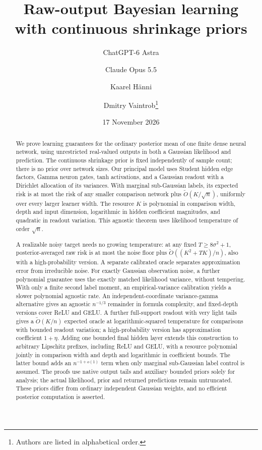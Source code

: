 \documentclass[11pt]{article}
\title{Raw-output Bayesian learning\\with continuous shrinkage priors}
\author{ChatGPT-6 Astra \and Claude Opus 5.5 \and Kaarel H\"anni \and
Dmitry Vaintrob\thanks{Authors are listed in alphabetical order.}}
\date{17 November 2026}
\theoremstyle{remark}\newtheorem{remark}[theorem]{Remark}
\begin{document}
\maketitle
\begin{abstract}
We prove learning guarantees for the ordinary posterior mean of one
finite dense neural network, using unrestricted real-valued outputs in
both a Gaussian likelihood and prediction. The continuous shrinkage
prior is fixed independently of sample count; there is no prior over
network sizes. Our principal model uses Student hidden edge factors,
Gamma neuron gates, tanh activations, and a Gaussian readout with a
Dirichlet allocation of its variances. With marginal sub-Gaussian labels,
its expected risk is at most the risk of any smaller comparison network
plus $\widetilde O(K/\sqrt n)$, uniformly over every larger learner width.
The resource $K$ is polynomial in comparison width, depth and input
dimension, logarithmic in hidden coefficient magnitudes, and quadratic
in readout variation. This agnostic theorem uses likelihood temperature
of order $\sqrt n$.

A realizable noisy target needs no growing temperature: at any fixed
$T\ge8\sigma^2+1$, posterior-averaged raw risk is at most the noise floor
plus $\widetilde O((K^2+TK)/n)$, also with a high-probability version.
A separate calibrated oracle separates approximation error from irreducible
noise. For exactly Gaussian observation noise, a further polynomial
guarantee uses the exactly matched likelihood variance, without tempering. With only a finite second label moment, an empirical-variance
calibration yields a slower polynomial agnostic rate. An independent-coordinate
variance-gamma alternative gives an agnostic $n^{-1/3}$ remainder in
formula complexity, and fixed-depth versions cover ReLU and GELU.
A further full-support readout with very light tails gives a
$\widetilde O(K/n)$ expected oracle at logarithmic-squared temperature
for comparisons with bounded readout variation; a high-probability
version has approximation coefficient $1+\eta$. Adding one bounded
final hidden layer extends this construction to arbitrary Lipschitz
prefixes, including ReLU and GELU, with a resource polynomial jointly
in comparison width and depth and logarithmic in coefficient bounds.
The latter bound adds an $n^{-1+o(1)}$ term when only marginal
sub-Gaussian label control is assumed.
The proofs use native output tails and auxiliary bounded priors solely
for analysis; the actual likelihood, prior and returned predictions
remain untruncated. These priors differ from ordinary independent
Gaussian weights, and no efficient posterior computation is asserted.
\end{abstract}
\end{document}
